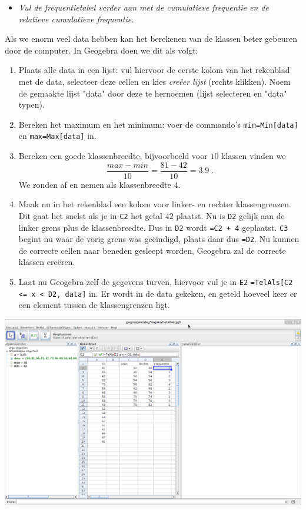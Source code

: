 \documentclass[11pt]{article}
\newcommand{\vraag}[2]{\begin{itemize}\item {\it #1} \vspace*{#2}\end{itemize}}
\begin{document}
\vraag{Vul de frequentietabel verder aan met de cumulatieve frequentie en de relatieve cumulatieve frequentie.}{0cm}

Als we enorm veel data hebben kan het berekenen van de klassen beter gebeuren door de computer. In Geogebra doen we dit als volgt:
\begin{enumerate}
  \item Plaats alle data in een lijst: vul hiervoor de eerste kolom van het rekenblad met de data, selecteer deze cellen en kies {\it creëer lijst} (rechts klikken). Noem de gemaakte lijst "data" door deze te hernoemen (lijst selecteren en "data" typen).
  \item Bereken het maximum en het minimum: voer de commando's \verb#min=Min[data]# en \verb#max=Max[data]# in.
  \item Bereken een goede klassenbreedte, bijvoorbeeld voor $10$ klassen vinden we $$\frac{max-min}{10}=\frac{81-42}{10}=3.9\;.$$ We ronden af en nemen als klassenbreedte $4$.
  \item Maak nu in het rekenblad een kolom voor linker- en rechter klassengrenzen. Dit gaat het snelst als je in \verb#C2# het getal $42$ plaatst. Nu is \verb#D2# gelijk aan de linker grens plus de klassenbreedte. Dus in \verb#D2# wordt \verb#=C2 + 4# geplaatst. \verb#C3# begint nu waar de vorig grens was geëindigd, plaats daar dus \verb#=D2#. Nu kunnen de correcte cellen naar beneden gesleept worden, Geogebra zal de correcte klassen creëren.
  \item Laat nu Geogebra zelf de gegevens turven, hiervoor vul je in \verb#E2# \verb#=TelAls[C2 <= x < D2, data]# in. Er wordt in de data gekeken, en geteld hoeveel keer er een element tussen de klassengrenzen ligt.
\end{enumerate}

\begin{center}
  \includegraphics[width=14cm]{gg-gegroepeerde_frequentietabel}
\end{center}
\end{document}
